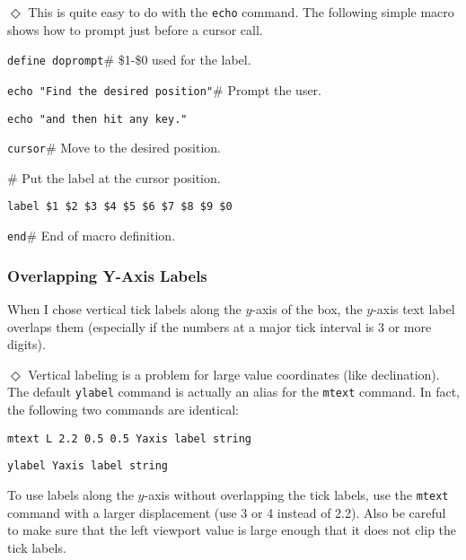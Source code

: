 \indent$\Diamond$
This is quite easy to do with the
{\tt echo}
command.
The following simple macro shows how to prompt just before a cursor call.
\begin{wiplist}%
  \item {\tt define doprompt}\hfill\# \$1-\$0 used for the label.
\samepage
  \item [\wipd] {\tt echo "Find the desired position"}\hfill\# Prompt the user.
  \item [\wipd] {\tt echo "and then hit any key."}
  \item [\wipd] {\tt cursor}\hfill\# Move to the desired position.
  \item [\wipd] \hfill\# Put the label at the cursor position.
  \item [\wipd] {\tt label \$1 \$2 \$3 \$4 \$5 \$6 \$7 \$8 \$9 \$0}
  \item [\wipd] {\tt end}\hfill\# End of macro definition.
\end{wiplist}

\subsubsection*         {Overlapping Y-Axis Labels}

When I chose vertical tick labels along the $y$-axis of the box,
the $y$-axis text label overlaps them (especially if the numbers
at a major tick interval is 3 or more digits).

\indent$\Diamond$
Vertical labeling is a problem for large value coordinates (like declination).
The default {\tt ylabel} command is
actually an alias for the {\tt mtext} command.
In fact, the following two commands are identical:
\begin{wiplist}%
  \item [\wipd] {\tt mtext L 2.2 0.5 0.5 Yaxis label string}
\samepage
  \item [\wipd] {\tt ylabel Yaxis label string}
\end{wiplist}
To use labels along the $y$-axis without overlapping the tick labels,
use the {\tt mtext} command with a larger displacement (\ie use 3 or 4
instead of 2.2).
Also be careful to make sure that the left viewport value is large enough
that it does not clip the tick labels.


